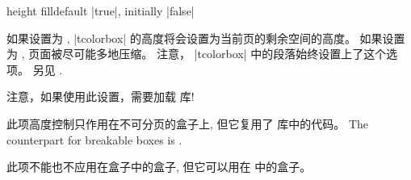 \begin{docTcbKey}[][doc new and updated={2014-09-22}{2016-02-17}]{height fill}{}{default |true|, initially |false|}
  
  如果设置为 , |tcolorbox| 的高度将会设置为当前页的剩余空间的高度。%
  如果设置为 , 页面被尽可能多地压缩。%
  注意， |tcolorbox| 中的段落始终设置上了这个选项。%
  另见 .%
  \begin{marker}
  
  注意，如果使用此设置，需要加载  库!
  \end{marker}
  
  此项高度控制只作用在不可分页的盒子上, 但它复用了  库中的代码。
  The counterpart for breakable boxes is .
  
  
  此项不能也不应用在盒子中的盒子, 但它可以用在  中的盒子。
  
  \begin{dispListing}
  \begin{tcolorbox}[height fill,
    colback=red!5!white,colframe=red!75!black,fonttitle=\bfseries,
    title=填充页面剩余部分的盒子]
  \lipsum[1]
  \end{tcolorbox}
  \end{dispListing}
  \end{docTcbKey}
  {\tcbusetemp}
  



